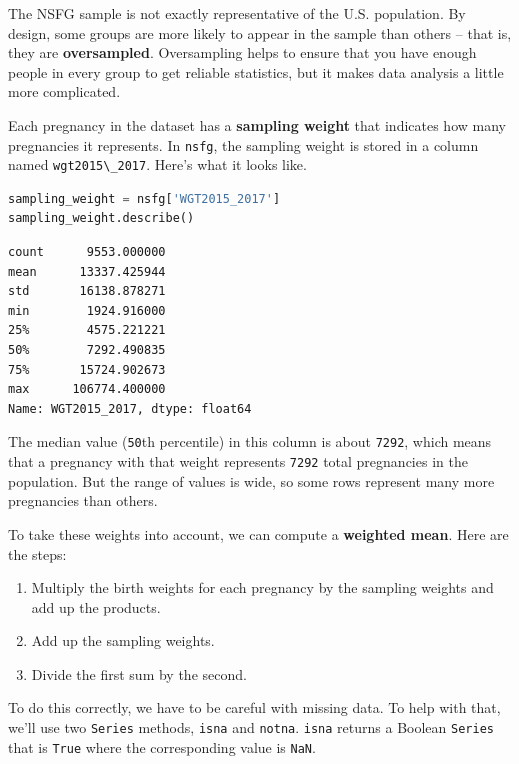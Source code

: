 The NSFG sample is not exactly representative of the U.S. population. By
design, some groups are more likely to appear in the sample than others
-- that is, they are \textbf{oversampled}. Oversampling helps to ensure
that you have enough people in every group to get reliable statistics,
but it makes data analysis a little more complicated.

Each pregnancy in the dataset has a \textbf{sampling weight} that
indicates how many pregnancies it represents. In
\passthrough{\lstinline!nsfg!}, the sampling weight is stored in a
column named \passthrough{\lstinline!wgt2015\_2017!}. Here's what it
looks like.

\begin{lstlisting}[language=Python,style=source]
sampling_weight = nsfg['WGT2015_2017']
sampling_weight.describe()
\end{lstlisting}

\begin{lstlisting}[style=output]
count      9553.000000
mean      13337.425944
std       16138.878271
min        1924.916000
25%        4575.221221
50%        7292.490835
75%       15724.902673
max      106774.400000
Name: WGT2015_2017, dtype: float64
\end{lstlisting}

The median value (\passthrough{\lstinline!50!}th percentile) in this
column is about \passthrough{\lstinline!7292!}, which means that a
pregnancy with that weight represents \passthrough{\lstinline!7292!}
total pregnancies in the population. But the range of values is wide, so
some rows represent many more pregnancies than others.

To take these weights into account, we can compute a \textbf{weighted
mean}. Here are the steps:

\begin{enumerate}
\def\labelenumi{\arabic{enumi}.}
\item
  Multiply the birth weights for each pregnancy by the sampling weights
  and add up the products.
\item
  Add up the sampling weights.
\item
  Divide the first sum by the second.
\end{enumerate}

To do this correctly, we have to be careful with missing data. To help
with that, we'll use two \passthrough{\lstinline!Series!} methods,
\passthrough{\lstinline!isna!} and \passthrough{\lstinline!notna!}.
\passthrough{\lstinline!isna!} returns a Boolean
\passthrough{\lstinline!Series!} that is \passthrough{\lstinline!True!}
where the corresponding value is \passthrough{\lstinline!NaN!}.

